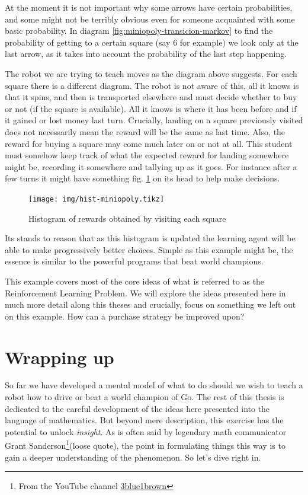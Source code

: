 At the moment it is not important why some arrows have certain 
probabilities, and some might not be terribly obvious even for 
someone acquainted with some basic probability. In diagram 
\ref{fig:miniopoly-transicion-markov} to find the probability of 
getting to a certain square (say 6 for example) we look only at 
the last arrow, as it takes into account the probability of the 
last step happening.

The robot we are trying to teach moves as the diagram above 
suggests. For each square there is a different diagram. The 
robot is not aware of this, all it knows is that it spins, and 
then is transported elsewhere and must decide whether to buy or 
not (if the square is available). All it knows is where it has 
been before and if it gained or lost money last turn. Crucially, 
landing on a square previously visited does not necessarily mean 
the reward will be the same as last time. Also, the reward for 
buying a square may come much later on or not at all. This 
student must somehow keep track of what the expected reward for 
landing somewhere might be, recording it somewhere and tallying 
up as it goes. For instance after a few turns it might have 
something fig. \ref{fig:hist-miniopoly} on its head to help make 
decisions.

\begin{figure}
\centering
\texttt{[image: img/hist-miniopoly.tikz]}
\label{fig:hist-miniopoly}
\caption{Histogram of rewards obtained by visiting each square}
\end{figure}

Its stands to reason that as this histogram is updated the 
learning agent will be able to make progressively better 
choices. Simple as this example might be, the essence is similar 
to the powerful programs that beat world champions.

This example covers most of the core ideas of what is referred 
to as the Reinforcement Learning Problem. We will explore the 
ideas presented here in much more detail along this theses and 
crucially, focus on something we left out on this example. How 
can a purchase strategy be improved upon?

\section{Wrapping up}
So far we have developed a mental model of what to do should we 
wish to teach a robot how to drive or beat a world champion of 
Go. The rest of this thesis is dedicated to the careful 
development of the ideas here presented into the language of 
mathematics.  But beyond mere description, this exercise has the 
potential to unlock \textit{insight}. As is often said by 
legendary math communicator Grant Sanderson\footnote{From the 
	YouTube channel 
\href{https://www.youtube.com/channel/UCYO_jab_esuFRV4b17AJtAw}{3blue1brown}}(loose 
quote), the point in formulating things this way is to gain a 
deeper understanding of the phenomenon. So let's dive right in.
